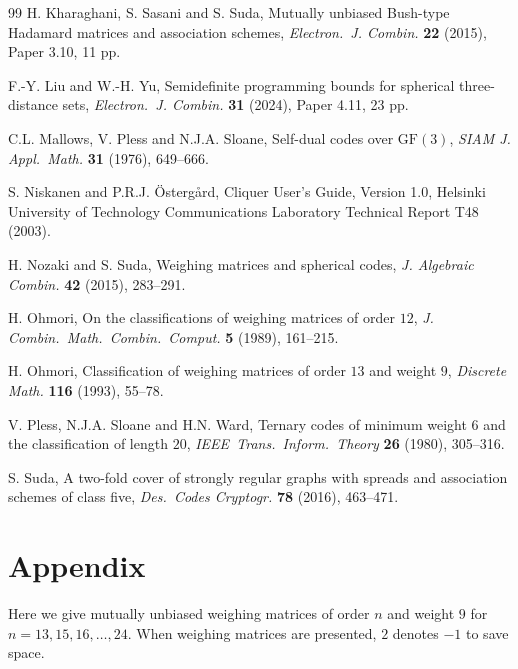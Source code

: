 \documentclass[12pt]{article}
\theoremstyle{remark}
\begin{document}
\begin{thebibliography}{99}
H. Kharaghani, S. Sasani and S. Suda, 
Mutually unbiased Bush-type Hadamard matrices and association schemes,
\textsl{Electron.\ J. Combin.}
\textbf{22} (2015), Paper 3.10, 11 pp.

F.-Y. Liu and W.-H. Yu, 
Semidefinite programming bounds for spherical three-distance sets, 
\textsl{Electron.\ J. Combin.}
\textbf{31} (2024), Paper 4.11, 23 pp.


C.L. Mallows, V. Pless and N.J.A. Sloane, 
Self-dual codes over $\mathrm{GF}(3)$, 
\textsl{SIAM J. Appl.\ Math.}
\textbf{31} (1976), 649--666.

S. Niskanen and P.R.J. \"Osterg\aa rd,
Cliquer User's Guide, Version 1.0,
Helsinki University of Technology Communications Laboratory Technical Report T48 (2003).

H. Nozaki and S. Suda, 
Weighing matrices and spherical codes, 
\textsl{J. Algebraic Combin.} 
\textbf{42} (2015), 283--291.

 H. Ohmori, 
On the classifications of weighing matrices of order $12$, 
\textsl{J. Combin.\ Math.\ Combin.\ Comput.}
\textbf{5} (1989), 161--215. 


 H. Ohmori, 
Classification of weighing matrices of order $13$ and weight $9$,
\textsl{Discrete Math.}
\textbf{116} (1993), 55--78.


 V. Pless, N.J.A. Sloane and H.N. Ward, 
Ternary codes of minimum weight $6$ and the classification of length $20$, 
\textsl{IEEE\ Trans.\ Inform.\ Theory} 
\textbf{26} (1980), 305--316.

S. Suda,  
A two-fold cover of strongly regular graphs with spreads and association schemes of class five, 
\textsl{Des.\ Codes Cryptogr.} 
\textbf{78} (2016), 463--471. 

\end{thebibliography}


\section*{Appendix}
Here we give mutually unbiased weighing matrices of order $n$ and weight $9$
for $n=13,15,16,\ldots,24$.
When weighing matrices are presented, 
$2$ denotes $-1$ to save space.
\end{document}

